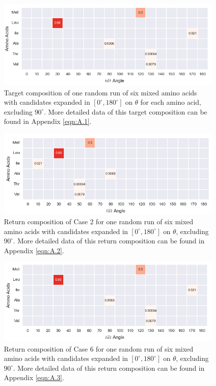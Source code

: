\begin{figure}[!ht] 
\centering
\includegraphics[scale=0.7]{Figures/mixture_target_composition_for_one_run_theta_0_180.png}
\caption{Target composition of one random run of six mixed amino acids with candidates expanded in $[0^{\circ}, 180^{\circ}]$ on $\theta$ for each amino acid, excluding $90^{\circ}$. More detailed data of this target composition can be found in Appendix \ref{eqn:A.1}. } 
\label{fig:5.4}
\end{figure}

\begin{figure}[!ht] 
\centering
\includegraphics[scale=0.7]{Figures/mixture_return_composition_of_E2_for_one_run_theta_0_180.png}
\caption{Return composition of Case 2 for one random run of six mixed amino acids with candidates expanded in $[0^{\circ}, 180^{\circ}]$ on $\theta$, excluding $90^{\circ}$. More detailed data of this return composition can be found in Appendix \ref{eqn:A.2}.} 
\label{fig:5.5}
\end{figure}

\begin{figure}[!ht] 
\centering
\includegraphics[scale=0.7]{Figures/mixture_return_composition_of_E6_for_one_run_theta_0_180.png}
\caption{Return composition of Case 6 for one random run of six mixed amino acids with candidates expanded in $[0^{\circ}, 180^{\circ}]$ on $\theta$, excluding $90^{\circ}$. More detailed data of this return composition can be found in Appendix \ref{eqn:A.3}.} 
\label{fig:5.6}
\end{figure}

